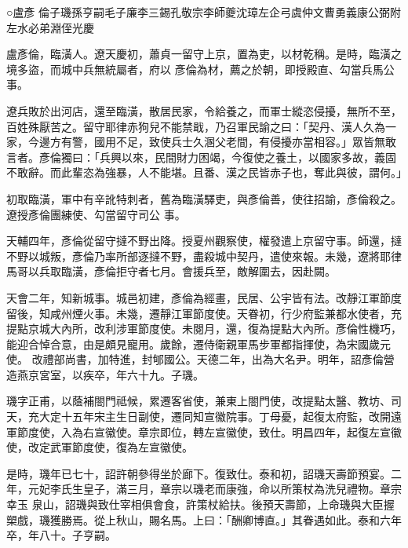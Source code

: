 
\begin{pinyinscope}

 ○盧彥
 倫子璣孫亨嗣毛子廉李三錫孔敬宗李師夔沈璋左企弓虞仲文曹勇義康公弼附左水必弟淵侄光慶



 盧彥倫，臨潢人。遼天慶初，蕭貞一留守上京，置為吏，以材乾稱。是時，臨潢之境多盜，而城中兵無統屬者，府以
 彥倫為材，薦之於朝，即授殿直、勾當兵馬公事。



 遼兵敗於出河店，還至臨潢，散居民家，令給養之，而軍士縱恣侵擾，無所不至，百姓殊厭苦之。留守耶律赤狗兒不能禁戢，乃召軍民諭之曰：「契丹、漢人久為一家，今邊方有警，國用不足，致使兵士久溷父老間，有侵擾亦當相容。」眾皆無敢言者。彥倫獨曰：「兵興以來，民間財力困竭，今復使之養土，以國家多故，義固不敢辭。而此輩恣為強暴，人不能堪。且番、漢之民皆赤子也，奪此與彼，謂何。」



 初取臨潢，軍中有辛訛特刺者，舊為臨潢驛吏，與彥倫善，使往招諭，彥倫殺之。遼授彥倫團練使、勾當留守司公
 事。



 天輔四年，彥倫從留守撻不野出降。授夏州觀察使，權發遣上京留守事。師還，撻不野以城叛，彥倫乃率所部逐撻不野，盡殺城中契丹，遣使來報。未幾，遼將耶律馬哥以兵取臨潢，彥倫拒守者七月。會援兵至，敵解圍去，因赴闕。



 天會二年，知新城事。城邑初建，彥倫為經畫，民居、公宇皆有法。改靜江軍節度留後，知咸州煙火事。未幾，遷靜江軍節度使。天眷初，行少府監兼都水使者，充提點京城大內所，改利涉軍節度使。未閱月，還，復為提點大內所。彥倫性機巧，能迎合悼合意，由是頗見寵用。歲餘，遷侍衛親軍馬步軍都指揮使，為宋國歲元使。
 改禮部尚書，加特進，封郇國公。天德二年，出為大名尹。明年，詔彥倫營造燕京宮室，以疾卒，年六十九。子璣。



 璣字正甫，以蔭補閤門祗候，累遷客省使，兼東上閤門使，改提點太醫、教坊、司天，充大定十五年宋主生日副使，遷同知宣徽院事。丁母憂，起復太府監，改開遠軍節度使，入為右宣徽使。章宗即位，轉左宣徽使，致仕。明昌四年，起復左宣徽使，改定武軍節度使，復為左宣徽使。



 是時，璣年已七十，詔許朝參得坐於廊下。復致仕。泰和初，詔璣天壽節預宴。二年，元妃李氏生皇子，滿三月，章宗以璣老而康強，命以所策杖為洗兒禮物。章宗幸玉
 泉山，詔璣與致仕宰相俱會食，許策杖給扶。後預天壽節，上命璣與大臣握槊戲，璣獲勝焉。從上秋山，賜名馬。上曰：「酬卿博直。」其眷遇如此。泰和六年卒，年八十。子亨嗣。




\end{pinyinscope}
